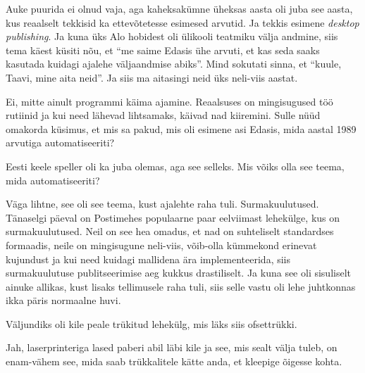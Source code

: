 
Auke puurida ei olnud vaja, aga kaheksakümne üheksas aasta oli juba see aasta, 
kus reaalselt tekkisid ka ettevõtetesse esimesed arvutid. Ja tekkis esimene 
\emph{desktop publishing}. Ja kuna üks Alo hobidest oli ülikooli teatmiku välja 
andmine, siis tema käest küsiti nõu, et \enquote{me saime Edasis ühe arvuti, et 
kas seda saaks kasutada kuidagi ajalehe väljaandmise abiks}. Mind sokutati 
sinna, et \enquote{kuule, Taavi, mine aita neid}. Ja siis ma aitasingi neid üks 
neli-viis aastat.


Ei, mitte ainult  programmi käima ajamine. Reaalsuses on mingisugused töö 
rutiinid ja kui need lähevad lihtsamaks, käivad nad kiiremini. Sulle nüüd 
omakorda küsimus, et mis sa pakud, mis oli esimene asi Edasis, 
mida aastal 1989 arvutiga automatiseeriti?


Eesti keele speller oli ka juba olemas, aga see selleks. Mis võiks olla see 
teema, mida automatiseeriti?


Väga lihtne, see oli see teema, kust ajalehte raha tuli. Surmakuulutused. 
Tänaselgi päeval on Postimehes populaarne paar eelviimast lehekülge, kus on  
surmakuulutused. Neil on see hea omadus, et nad on suhteliselt standardses 
formaadis, neile on mingisugune neli-viis, võib-olla kümmekond erinevat 
kujundust ja kui need kuidagi mallidena ära implementeerida, siis 
surmakuulutuse publitseerimise aeg kukkus drastiliselt. Ja kuna see oli 
sisuliselt ainuke allikas, kust lisaks tellimusele raha tuli, siis selle vastu 
oli lehe juhtkonnas ikka päris normaalne huvi.


Väljundiks oli kile peale trükitud lehekülg, mis läks siis ofsettrükki.


Jah, laserprinteriga lased paberi abil läbi kile ja see, mis sealt välja tuleb, 
on enam-vähem see, mida saab trükkalitele kätte anda, et kleepige õigesse kohta.



